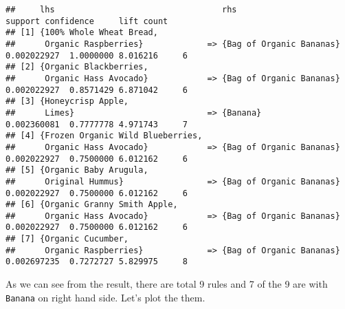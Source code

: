 \documentclass[]{article}
\newenvironment{Shaded}{\begin{snugshade}}{\end{snugshade}}
\newcommand{\CommentTok}[1]{\textcolor[rgb]{0.56,0.35,0.01}{\textit{#1}}}
\newcommand{\DataTypeTok}[1]{\textcolor[rgb]{0.13,0.29,0.53}{#1}}
\newcommand{\DecValTok}[1]{\textcolor[rgb]{0.00,0.00,0.81}{#1}}
\newcommand{\KeywordTok}[1]{\textcolor[rgb]{0.13,0.29,0.53}{\textbf{#1}}}
\newcommand{\NormalTok}[1]{#1}
\newcommand{\OperatorTok}[1]{\textcolor[rgb]{0.81,0.36,0.00}{\textbf{#1}}}
\newcommand{\StringTok}[1]{\textcolor[rgb]{0.31,0.60,0.02}{#1}}
\begin{document}
\begin{Shaded}
\end{Shaded}

\begin{verbatim}
##     lhs                                  rhs                          support confidence     lift count
## [1] {100% Whole Wheat Bread,                                                                           
##      Organic Raspberries}             => {Bag of Organic Bananas} 0.002022927  1.0000000 8.016216     6
## [2] {Organic Blackberries,                                                                             
##      Organic Hass Avocado}            => {Bag of Organic Bananas} 0.002022927  0.8571429 6.871042     6
## [3] {Honeycrisp Apple,                                                                                 
##      Limes}                           => {Banana}                 0.002360081  0.7777778 4.971743     7
## [4] {Frozen Organic Wild Blueberries,                                                                  
##      Organic Hass Avocado}            => {Bag of Organic Bananas} 0.002022927  0.7500000 6.012162     6
## [5] {Organic Baby Arugula,                                                                             
##      Original Hummus}                 => {Bag of Organic Bananas} 0.002022927  0.7500000 6.012162     6
## [6] {Organic Granny Smith Apple,                                                                       
##      Organic Hass Avocado}            => {Bag of Organic Bananas} 0.002022927  0.7500000 6.012162     6
## [7] {Organic Cucumber,                                                                                 
##      Organic Raspberries}             => {Bag of Organic Bananas} 0.002697235  0.7272727 5.829975     8
\end{verbatim}

As we can see from the result, there are total 9 rules and 7 of the 9
are with \texttt{Banana} on right hand side. Let's plot the them.
\end{document}
